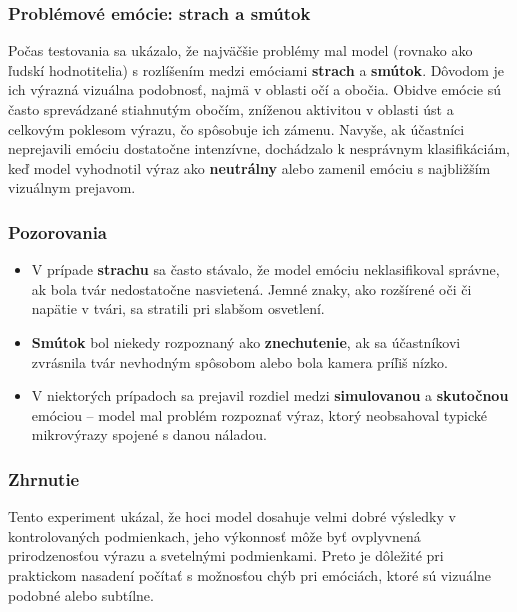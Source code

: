\subsubsection{Probl\'emov\'e em\'ocie: strach a sm\'utok}
Po\v{c}as testovania sa uk\'azalo, \v{z}e najv\"a\v{c}\v{s}ie probl\'emy mal model (rovnako ako \v{l}udsk\'i hodnotitelia) s rozl\'i\v{s}en\'im medzi em\'ociami \textbf{strach} a \textbf{sm\'utok}. D\^ovodom je ich v\'yrazn\'a vizu\'alna podobnos\v{t}, najm\"a v oblasti o\v{c}\'i a obo\v{c}ia. Obidve em\'ocie s\'u \v{c}asto sprev\'adzan\'e stiahnut\'ym obo\v{c}\'im, zn\'i\v{z}enou aktivitou v oblasti \'ust a celkov\'ym poklesom v\'yrazu, \v{c}o sp\^osobuje ich z\'amenu. Navy\v{s}e, ak \'u\v{c}astn\'ici neprejavili em\'ociu dostato\v{c}ne intenz\'ivne, doch\'adzalo k nespr\'avnym klasifik\'aci\'am, ke\v{d} model vyhodnotil v\'yraz ako \textbf{neutr\'alny} alebo zamenil em\'ociu s najbli\v{z}\v{s}\'im vizu\'alnym prejavom.

\subsubsection{Pozorovania}
\begin{itemize}
    \item V pr\'ipade \textbf{strachu} sa \v{c}asto st\'avalo, \v{z}e model em\'ociu neklasifikoval spr\'avne, ak bola tv\'ar nedostato\v{c}ne nasvieten\'a. Jemn\'e znaky, ako roz\v{s}\'iren\'e o\v{c}i \v{c}i nap\"atie v tv\'ari, sa stratili pri slab\v{s}om osvetlen\'i.
    \item \textbf{Sm\'utok} bol niekedy rozpoznan\'y ako \textbf{znechutenie}, ak sa \'u\v{c}astn\'ikovi zvr\'asnila tv\'ar nevhodn\'ym sp\^osobom alebo bola kamera pr\'i\v{l}i\v{s} n\'izko.
    \item V niektor\'ych pr\'ipadoch sa prejavil rozdiel medzi \textbf{simulovanou} a \textbf{skuto\v{c}nou} em\'ociou -- model mal probl\'em rozpozna\v{t}  v\'yraz, ktor\'y neobsahoval typick\'e mikrov\'yrazy spojen\'e s danou n\'aladou.
\end{itemize}

\subsubsection{Zhrnutie}
Tento experiment uk\'azal, \v{z}e hoci model dosahuje velmi dobr\'e v\'ysledky v kontrolovan\'ych podmienkach, jeho v\'ykonnos\v{t} m\^o\v{z}e by\v{t} ovplyvnen\'a prirodzenos\v{t}ou v\'yrazu a sveteln\'ymi podmienkami. Preto je d\^ole\v{z}it\'e pri praktickom nasaden\'i po\v{c}\'ita\v{t} s mo\v{z}nos\v{t}ou ch\'yb pri em\'oci\'ach, ktor\'e s\'u vizu\'alne podobn\'e alebo subt\'ilne.

